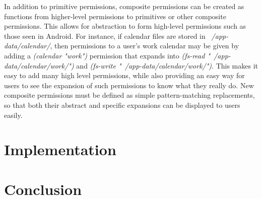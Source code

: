 In addition to primitive permissions, composite permissions can be created as functions from higher-level permissions to primitives or other composite permissions.  This allows for abstraction to form high-level permissions such as those seen in Android.  For instance, if calendar files are stored in \textit{~/app-data/calendar/}, then permissions to a user's work calendar may be given by adding a \textit{(calendar "work")} permission that expands into \textit{(fs-read "~/app-data/calendar/work/")} and \textit{(fs-write "~/app-data/calendar/work/")}.  This makes it easy to add many high level permissions, while also providing an easy way for users to see the expansion of such permissions to know what they really do.  New composite permissions must be defined as simple pattern-matching replacements, so that both their abstract and specific expansions can be displayed to users easily.



\section{Implementation}\label{section:implementation}

\section{Conclusion}\label{section:conclusion}

